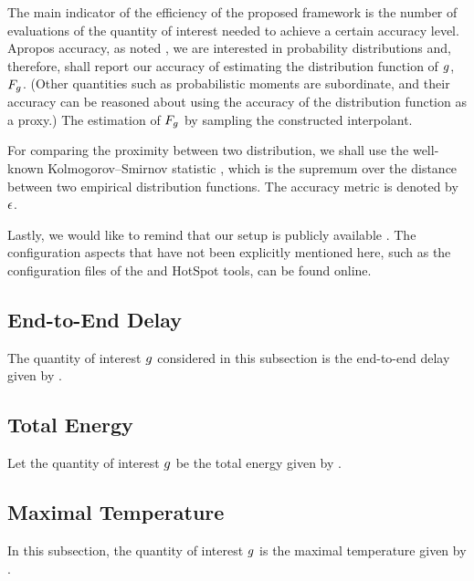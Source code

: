 The main indicator of the efficiency of the proposed framework is the number of
evaluations of the quantity of interest needed to achieve a certain accuracy
level. Apropos accuracy, as noted , we are interested in
probability distributions and, therefore, shall report our accuracy of
estimating the distribution function of $g$, $F_g$. (Other
quantities such as probabilistic moments are subordinate, and their accuracy can
be reasoned about using the accuracy of the distribution function as a proxy.)
The estimation of $F_g$ by sampling the constructed interpolant.

For comparing the proximity between two distribution, we shall use the
well-known Kolmogorov--Smirnov statistic \cite{rao2009}, which is the supremum
over the distance between two empirical distribution functions. The accuracy
metric is denoted by $\epsilon$.

Lastly, we would like to remind that our setup is publicly available
\cite{sources}. The configuration aspects that have not been explicitly
mentioned here, such as the configuration files of the  and HotSpot
tools, can be found online.


\subsection{End-to-End Delay}
The quantity of interest $g$ considered in this subsection is the end-to-end
delay given by .

\subsection{Total Energy}
Let the quantity of interest $g$ be the total energy given by
.

\subsection{Maximal Temperature}
In this subsection, the quantity of interest $g$ is the maximal temperature
given by .
